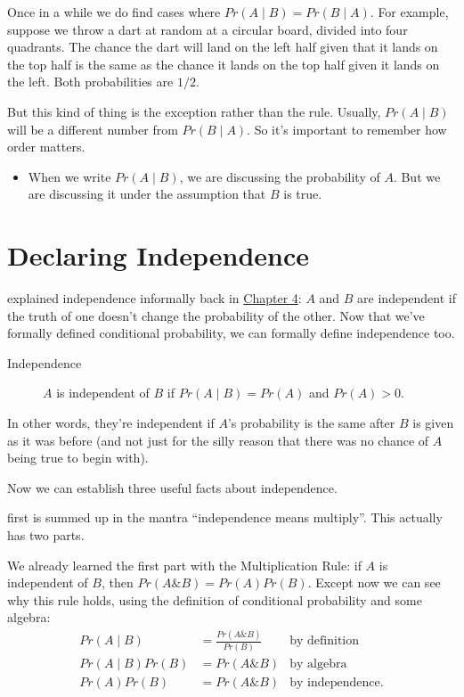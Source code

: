 \documentclass[justified]{tufte-book}
\newcommand{\given}{\mid}
\renewcommand{\wedge}{\mathbin{\&}}
\newcommand{\p}{Pr}
\newenvironment{warning}{\begin{itemize}\item[\faBan]}{\end{itemize}}
\theoremstyle{definition}
\theoremstyle{definition}
\theoremstyle{definition}
\theoremstyle{remark}
\begin{document}
Once in a while we do find cases where
\(\p(A \given B) = \p(B \given A)\). For example, suppose we throw a
dart at random at a circular board, divided into four quadrants. The
chance the dart will land on the left half given that it lands on the
top half is the same as the chance it lands on the top half given it
lands on the left. Both probabilities are \(1/2\).

But this kind of thing is the exception rather than the rule. Usually,
\(\p(A \given B)\) will be a different number from \(\p(B \given A)\).
So it's important to remember how order matters.

\begin{warning}
When we write \(\p(A \given B)\), we are discussing the probability of
\(A\). But we are discussing it under the assumption that \(B\) is true.
\end{warning}

\hypertarget{declaring-independence}{%
\section{Declaring Independence}\label{declaring-independence}}

 explained independence informally back in
\protect\hyperlink{independence-1}{Chapter 4}: \(A\) and \(B\) are
independent if the truth of one doesn't change the probability of the
other. Now that we've formally defined conditional probability, we can
formally define independence too.

\begin{description}
\item[Independence]
\(A\) is independent of \(B\) if \(\p(A \given B) = \p(A)\) and
\(\p(A) > 0\).
\end{description}

In other words, they're independent if \(A\)'s probability is the same
after \(B\) is given as it was before (and not just for the silly reason
that there was no chance of \(A\) being true to begin with).

Now we can establish three useful facts about independence.

 first is summed up in the mantra ``independence means
multiply''. This actually has two parts.

We already learned the first part with the Multiplication Rule: if \(A\)
is independent of \(B\), then \(\p(A \wedge B) = \p(A)\p(B)\). Except
now we can see why this rule holds, using the definition of conditional
probability and some algebra: \[
  \begin{aligned}
    \p(A \given B)      &= \frac{\p(A \wedge B)}{\p(B)} & \mbox{by definition}\\
    \p(A \given B)\p(B) &= \p(A \wedge B)               & \mbox{by algebra}\\
    \p(A)\p(B)          &= \p(A \wedge B)               & \mbox{by independence}.
  \end{aligned}
\]
\end{document}
